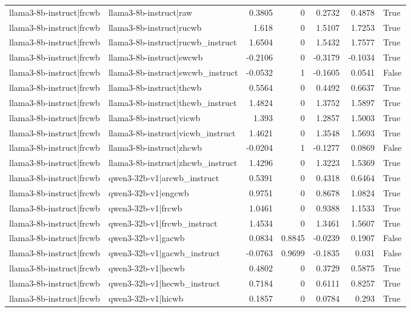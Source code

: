 \begin{table}
\begin{tabular}{l l r r r r l}
llama3-8b-instruct|frcwb & llama3-8b-instruct|raw & 0.3805 & 0 & 0.2732 & 0.4878 & True \\
llama3-8b-instruct|frcwb & llama3-8b-instruct|rucwb & 1.618 & 0 & 1.5107 & 1.7253 & True \\
llama3-8b-instruct|frcwb & llama3-8b-instruct|rucwb_instruct & 1.6504 & 0 & 1.5432 & 1.7577 & True \\
llama3-8b-instruct|frcwb & llama3-8b-instruct|swcwb & -0.2106 & 0 & -0.3179 & -0.1034 & True \\
llama3-8b-instruct|frcwb & llama3-8b-instruct|swcwb_instruct & -0.0532 & 1 & -0.1605 & 0.0541 & False \\
llama3-8b-instruct|frcwb & llama3-8b-instruct|thcwb & 0.5564 & 0 & 0.4492 & 0.6637 & True \\
llama3-8b-instruct|frcwb & llama3-8b-instruct|thcwb_instruct & 1.4824 & 0 & 1.3752 & 1.5897 & True \\
llama3-8b-instruct|frcwb & llama3-8b-instruct|vicwb & 1.393 & 0 & 1.2857 & 1.5003 & True \\
llama3-8b-instruct|frcwb & llama3-8b-instruct|vicwb_instruct & 1.4621 & 0 & 1.3548 & 1.5693 & True \\
llama3-8b-instruct|frcwb & llama3-8b-instruct|zhcwb & -0.0204 & 1 & -0.1277 & 0.0869 & False \\
llama3-8b-instruct|frcwb & llama3-8b-instruct|zhcwb_instruct & 1.4296 & 0 & 1.3223 & 1.5369 & True \\
llama3-8b-instruct|frcwb & qwen3-32b-v1|arcwb_instruct & 0.5391 & 0 & 0.4318 & 0.6464 & True \\
llama3-8b-instruct|frcwb & qwen3-32b-v1|engcwb & 0.9751 & 0 & 0.8678 & 1.0824 & True \\
llama3-8b-instruct|frcwb & qwen3-32b-v1|frcwb & 1.0461 & 0 & 0.9388 & 1.1533 & True \\
llama3-8b-instruct|frcwb & qwen3-32b-v1|frcwb_instruct & 1.4534 & 0 & 1.3461 & 1.5607 & True \\
llama3-8b-instruct|frcwb & qwen3-32b-v1|gacwb & 0.0834 & 0.8845 & -0.0239 & 0.1907 & False \\
llama3-8b-instruct|frcwb & qwen3-32b-v1|gacwb_instruct & -0.0763 & 0.9699 & -0.1835 & 0.031 & False \\
llama3-8b-instruct|frcwb & qwen3-32b-v1|hecwb & 0.4802 & 0 & 0.3729 & 0.5875 & True \\
llama3-8b-instruct|frcwb & qwen3-32b-v1|hecwb_instruct & 0.7184 & 0 & 0.6111 & 0.8257 & True \\
llama3-8b-instruct|frcwb & qwen3-32b-v1|hicwb & 0.1857 & 0 & 0.0784 & 0.293 & True \\

\end{tabular}
\end{table}
